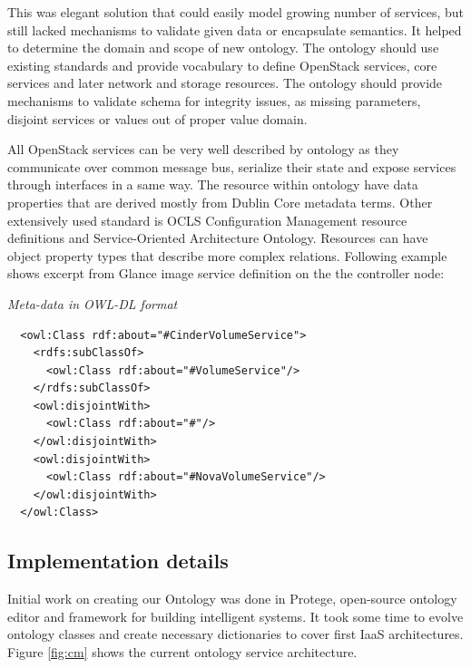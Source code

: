 This was elegant solution that could easily model growing number of services, but still lacked mechanisms to validate given data or encapsulate semantics. It helped to determine the domain and scope of new ontology. The ontology should use existing standards and provide vocabulary to define OpenStack services, core services and later network and storage resources. The ontology should provide mechanisms to validate schema for integrity issues, as missing parameters, disjoint services or values out of proper value domain.


All OpenStack services can be very well described by ontology as they communicate over common message bus, serialize their state and expose services through interfaces in a same way. The resource within ontology have data properties that are derived mostly from Dublin Core metadata terms. Other extensively used standard is OCLS Configuration Management resource definitions and Service-Oriented Architecture Ontology.  Resources can have object property types that describe more complex relations. Following example shows excerpt from Glance image service definition on the the controller node: 

\medskip

\noindent
{\it Meta-data in OWL-DL format}
\begin{verbatim}
  <owl:Class rdf:about="#CinderVolumeService">
    <rdfs:subClassOf>
      <owl:Class rdf:about="#VolumeService"/>
    </rdfs:subClassOf>
    <owl:disjointWith>
      <owl:Class rdf:about="#"/>
    </owl:disjointWith>
    <owl:disjointWith>
      <owl:Class rdf:about="#NovaVolumeService"/>
    </owl:disjointWith>
  </owl:Class>
\end{verbatim}
\noindent

\subsection{Implementation details}


Initial work on creating our Ontology was done in Protege, open-source ontology editor and framework for building intelligent systems. It took some time to evolve ontology classes and create necessary dictionaries \cite{OntologyEvolution} to cover first IaaS architectures. Figure \ref{fig:cm} shows the current ontology service architecture.

